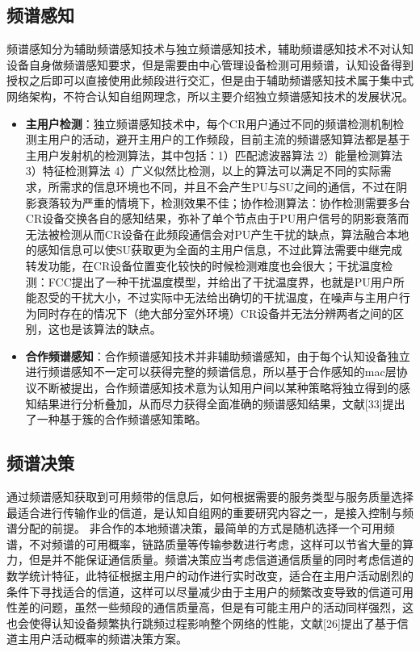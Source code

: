 \documentclass[a4paper,AutoFakeBold,oneside,12pt]{book}
\begin{document}
\subsection{频谱感知}
  频谱感知分为辅助频谱感知技术与独立频谱感知技术，辅助频谱感知技术不对认知设备自身做频谱感知要求，但是需要由中心管理设备检测可用频谱，认知设备得到授权之后即可以直接使用此频段进行交汇，但是由于辅助频谱感知技术属于集中式网络架构，不符合认知自组网理念，所以主要介绍独立频谱感知技术的发展状况。

  \begin{itemize}
\item  \textbf{主用户检测}：独立频谱感知技术中，每个CR用户通过不同的频谱检测机制检测主用户的活动，避开主用户的工作频段，目前主流的频谱感知算法都是基于主用户发射机的检测算法，其中包括：1）匹配滤波器算法 2）能量检测算法 3）特征检测算法 4）广义似然比检测，以上的算法可以满足不同的实际需求，所需求的信息环境也不同，并且不会产生PU与SU之间的通信，不过在阴影衰落较为严重的情境下，检测效果不佳；协作检测算法：协作检测需要多台CR设备交换各自的感知结果，弥补了单个节点由于PU用户信号的阴影衰落而无法被检测从而CR设备在此频段通信会对PU产生干扰的缺点，算法融合本地的感知信息可以使SU获取更为全面的主用户信息，不过此算法需要中继完成转发功能，在CR设备位置变化较快的时候检测难度也会很大；干扰温度检测：FCC提出了一种干扰温度模型，并给出了干扰温度界，也就是PU用户所能忍受的干扰大小，不过实际中无法给出确切的干扰温度，在噪声与主用户行为同时存在的情况下（绝大部分室外环境）CR设备并无法分辨两者之间的区别，这也是该算法的缺点。
\item \textbf{合作频谱感知}：合作频谱感知技术并非辅助频谱感知，由于每个认知设备独立进行频谱感知不一定可以获得完整的频谱信息，所以基于合作感知的mac层协议不断被提出，合作频谱感知技术意为认知用户间以某种策略将独立得到的感知结果进行分析叠加，从而尽力获得全面准确的频谱感知结果，文献[33]提出了一种基于簇的合作频谱感知策略。
\end{itemize}
\subsection{频谱决策}
  通过频谱感知获取到可用频带的信息后，如何根据需要的服务类型与服务质量选择最适合进行传输作业的信道，是认知自组网的重要研究内容之一，是接入控制与频谱分配的前提。
  非合作的本地频谱决策，最简单的方式是随机选择一个可用频谱，不对频谱的可用概率，链路质量等传输参数进行考虑，这样可以节省大量的算力，但是并不能保证通信质量。频谱决策应当考虑信道通信质量的同时考虑信道的数学统计特征，此特征根据主用户的动作进行实时改变，适合在主用户活动剧烈的条件下寻找适合的信道，这样可以尽量减少由于主用户的频繁改变导致的信道可用性差的问题，虽然一些频段的通信质量高，但是有可能主用户的活动同样强烈，这也会使得认知设备频繁执行跳频过程影响整个网络的性能，文献[26]提出了基于信道主用户活动概率的频谱决策方案。
\end{document}
